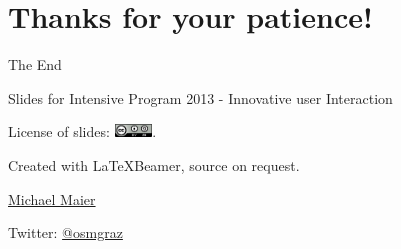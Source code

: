 \documentclass{beamer}
\begin{document}
\section{Thanks for your patience!}

\begin{frame}{The End}

  Slides for Intensive Program 2013 - Innovative user Interaction
\vspace{1cm}

License of slides: \includegraphics[width=1cm]{cc-by-sa.png}.
\vspace{1cm}

Created with \LaTeX Beamer, source on request.
\vspace{1cm}

\href{mailto:michael.maier@student.tugraz.at}{Michael Maier}

Twitter: \href{https://twitter.com/osmgraz}{@osmgraz}
\end{frame}
\end{document}
